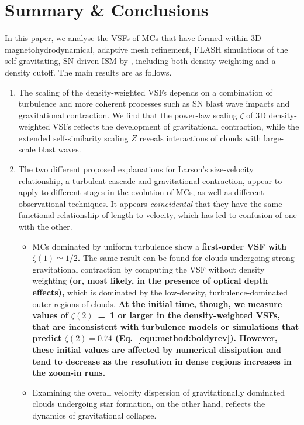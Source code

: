 \section{Summary \& Conclusions}\label{conclusions}

In this paper, we analyse the VSFs of MCs that have formed within 3D magnetohydrodynamical, adaptive mesh refinement, FLASH simulations of the self-gravitating, SN-driven ISM by , including both density weighting and a density cutoff.
The main results are as follows.

\begin{enumerate}
	\item The scaling of the density-weighted VSFs depends on a combination of turbulence and more coherent processes such as SN blast wave impacts and gravitational contraction. We find that the power-law scaling $\zeta$ of 3D density-weighted VSFs reflects the development of gravitational contraction, while the extended self-similarity scaling $Z$ reveals interactions of clouds with large-scale blast waves.
    \item The two different proposed explanations for Larson's size-velocity relationship, a turbulent cascade and gravitational contraction,  appear to apply to different stages in the evolution of MCs, as well as different observational techniques. It appears {\em coincidental} that they have the same functional relationship of length to velocity, which has led to confusion of one with the other.
    \begin{itemize}
        \item MCs dominated by uniform turbulence show a \textbf{first-order VSF with $\zeta(1) \simeq 1/2$. }
        The same result can be found for clouds undergoing strong gravitational contraction by computing the VSF without density weighting \textbf{(or, most likely, in the presence of optical depth effects),} which is dominated by the low-density, turbulence-dominated outer regions of clouds.
        \textbf{
        At the initial time, though, we measure values of $\zeta(2)$~=~1 or larger in the density-weighted VSFs, that are inconsistent with turbulence models or simulations that predict $\zeta(2) = 0.74$ (Eq.~\ref{equ:method:boldyrev}).
        However, these initial values are affected by numerical dissipation and tend to decrease as the resolution in dense regions increases in the zoom-in runs.
        }
        \item Examining the overall velocity dispersion of gravitationally dominated clouds undergoing star formation, on the other hand, reflects the dynamics of gravitational collapse.

\end{itemize}
\end{enumerate}
